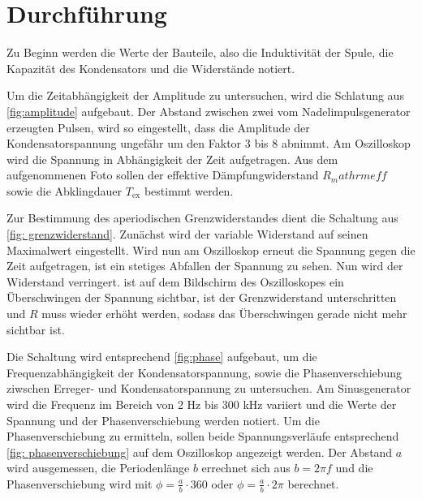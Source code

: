 \section{Durchführung}
\label{sec:durchführung}

Zu Beginn werden die Werte der Bauteile, also die Induktivität der Spule, die Kapazität des Kondensators und die Widerstände notiert.


Um die Zeitabhängigkeit der Amplitude zu untersuchen, wird die Schlatung aus \ref{fig:amplitude} aufgebaut. Der Abstand zwischen zwei vom Nadelimpulsgenerator erzeugten Pulsen, wird so eingestellt, dass die Amplitude der Kondensatorspannung ungefähr um den Faktor 3 bis 8 abnimmt. Am Oszilloskop wird die Spannung in Abhängigkeit der Zeit aufgetragen. Aus dem aufgenommenen Foto sollen der effektive Dämpfungwiderstand $R_mathrm{eff}$ sowie die Abklingdauer $T_\mathrm{ex}$ bestimmt werden.


Zur Bestimmung des aperiodischen Grenzwiderstandes dient die Schaltung aus \ref{fig: grenzwiderstand}. Zunächst wird der variable Widerstand auf seinen Maximalwert eingestellt. Wird nun am Oszilloskop erneut die Spannung gegen die Zeit aufgetragen, ist ein stetiges Abfallen der Spannung zu sehen. Nun wird der Widerstand verringert. ist auf dem Bildschirm des Oszilloskopes ein Überschwingen der Spannung sichtbar, ist der Grenzwiderstand unterschritten und $R$ muss wieder erhöht werden, sodass das Überschwingen gerade nicht mehr sichtbar ist.


Die Schaltung wird entsprechend \ref{fig:phase} aufgebaut, um die Frequenzabhängigkeit der Kondensatorspannung, sowie die Phasenverschiebung ziwschen Erreger- und Kondensatorspannung zu untersuchen. Am Sinusgenerator wird die Frequenz im Bereich von 2 \si{\Hz} bis 300 \si{\kilo\Hz} variiert und die Werte der Spannung und der Phasenverschiebung werden notiert. Um die Phasenverschiebung zu ermitteln, sollen beide Spannungsverläufe entsprechend \ref{fig: phasenverschiebung} auf dem Oszilloskop angezeigt werden. Der Abstand $a$ wird ausgemessen, die Periodenlänge $b$ errechnet sich aus $b = 2\pi f$ und die Phasenverschiebung wird mit $\phi = \frac{a}{b} \cdot 360$ oder $\phi = \frac{a}{b} \cdot 2\pi $ berechnet.

